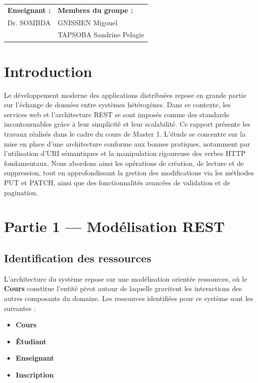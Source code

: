 \documentclass[12pt]{article}
\begin{document}
\vfill 
\noindent
\begin{tabularx}{\textwidth}{@{} X >{\raggedleft\arraybackslash}X @{}}
    \textbf{Enseignant :} & \textbf{Membres du groupe :} \\
    Dr. SOMBDA & GNISSIEN Migouel \\
               & TAPSOBA Sandrine Pelagie\\
\end{tabularx}

\newpage 

\renewcommand{\contentsname}{Table des matières}
\tableofcontents 
\newpage 

\listoffigures 
{}
\newpage 

\section*{Introduction}
Le développement moderne des applications distribuées repose en grande partie sur l'échange de données entre systèmes hétérogènes. Dans ce contexte, les services web et l'architecture REST se sont imposés comme des standards incontournables grâce à leur simplicité et leur scalabilité. Ce rapport présente les travaux réalisés dans le cadre du cours de Master 1. L'étude se concentre sur la mise en place d'une architecture conforme aux bonnes pratiques, notamment par l'utilisation d'URI sémantiques et la manipulation rigoureuse des verbes HTTP fondamentaux. Nous abordons ainsi les opérations de création, de lecture et de suppression, tout en approfondissant la gestion des modifications via les méthodes PUT et PATCH, ainsi que des fonctionnalités avancées de validation et de pagination.
\newpage 

\section{Partie 1 --- Modélisation REST}
\subsection{Identification des ressources}
L'architecture du système repose sur une modélisation orientée ressources, où le \textbf{Cours} constitue l'entité pivot autour de laquelle gravitent les interactions des autres composants du domaine. Les ressources identifiées pour ce système sont les suivantes :
\begin{itemize}
    \item \textbf{Cours}
    \item \textbf{Étudiant}
    \item \textbf{Enseignant}
    \item \textbf{Inscription}
\end{itemize}
\end{document}
